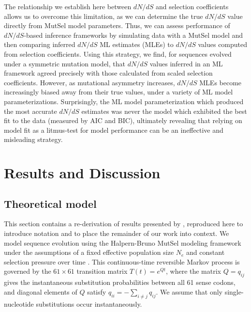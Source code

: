 \documentclass[11pt]{article}
\begin{document}
The relationship we establish here between $dN/dS$ and selection coefficients allows us to overcome this limitation, as we can determine the true $dN/dS$ value directly from MutSel model parameters. Thus, we can assess performance of $dN/dS$-based inference frameworks by simulating data with a MutSel model and then comparing inferred $dN/dS$ ML estimates (MLEs) to $dN/dS$ values computed from selection coefficients. Using this strategy, we find, for sequences evolved under a symmetric mutation model, that $dN/dS$ values inferred in an ML framework agreed precisely with those calculated from scaled selection coefficients. However, as mutational asymmetry increases, $dN/dS$ MLEs become increasingly biased away from their true values, under a variety of ML model parameterizations. Surprisingly, the ML model parameterization which produced the most accurate $dN/dS$ estimates was never the model which exhibited the best fit to the data (measured by AIC and BIC), ultimately revealing that relying on model fit as a litmus-test for model performance can be an ineffective and misleading strategy. 

		
\section*{Results and Discussion}
		
		
\subsection*{Theoretical model}
This section contains a re-derivation of results presented by \citet{HalpernBruno1998}, reproduced here to introduce notation and to place the remainder of our work into context. We model sequence evolution using the Halpern-Bruno MutSel modeling framework under the assumptions of a fixed effective population size $N_e$ and constant selection pressure over time \citep{HalpernBruno1998,YangNielsen2008,Tamurietal2012,Thorne2012}.  This continuous-time reversible Markov process is governed by the $61 \times 61$ transition matrix $T(t) = e^{Qt}$, where the matrix $Q = q_{ij}$ gives the instantaneous substitution probabilities between all 61 sense codons, and diagonal elements of $Q$ satisfy $q_{ii} = -\sum_{i \neq j} q_{ij}$. We assume that only single-nucleotide substitutions occur instantaneously. 
\end{document}
